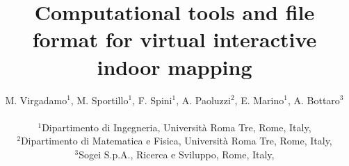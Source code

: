 \documentclass[10pt,twocolumn,letterpaper]{article}
\begin{document}
\title{Computational tools and file format for virtual interactive indoor mapping}


\author{M. Virgadamo$^1$, M. Sportillo$^1$, F. Spini$^1$, A. Paoluzzi$^2$, E. Marino$^1$, A. Bottaro$^3$ \\[5mm]
\begin{minipage}[c]{\textwidth}
    \centering
    {\small $^1$Dipartimento di Ingegneria, Universit\`a Roma Tre, Rome, Italy,}  \\
    {\small $^2$Dipartimento di Matematica e Fisica, Universit\`a Roma Tre, Rome, Italy,}  \\
    {\small $^3$Sogei S.p.A., Ricerca e Sviluppo, Rome, Italy,} 
\end{minipage}
}

\maketitle


\end{document}
